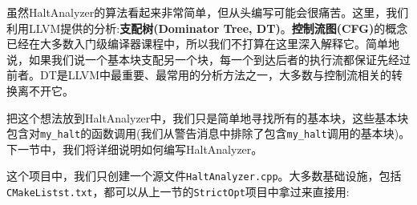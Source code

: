 虽然HaltAnalyzer的算法看起来非常简单，但从头编写可能会很痛苦。这里，我们利用LLVM提供的分析:\textbf{支配树(Dominator Tree, DT)}。\textbf{控制流图(CFG)}的概念已经在大多数入门级编译器课程中，所以我们不打算在这里深入解释它。简单地说，如果我们说一个基本块支配另一个块，每一个到达后者的执行流都保证先经过前者。DT是LLVM中最重要、最常用的分析方法之一，大多数与控制流相关的转换离不开它。

把这个想法放到HaltAnalyzer中，我们只是简单地寻找所有的基本块，这些基本块包含对\texttt{my\_halt}的函数调用(我们从警告消息中排除了包含\texttt{my\_halt}调用的基本块)。下一节中，我们将详细说明如何编写HaltAnalyzer。



这个项目中，我们只创建一个源文件\texttt{HaltAnalyzer.cpp}。大多数基础设施，包括\texttt{CMakeListst.txt}，都可以从上一节的\texttt{StrictOpt}项目中拿过来直接用:

